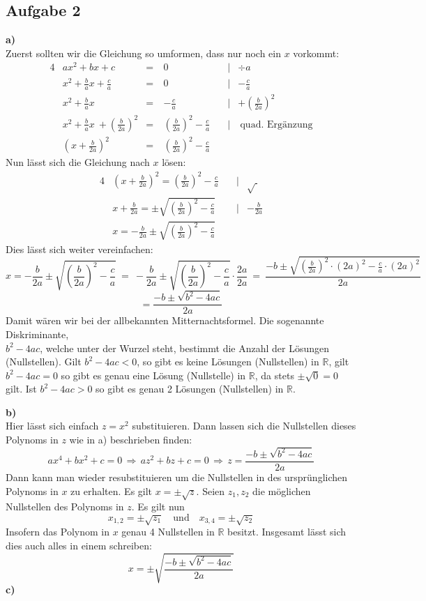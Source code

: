 \documentclass[a4paper,graphics,11pt]{article}
\newcommand{\aufgabe}[1]{\subsection*{Aufgabe #1}}
\begin{document}
\newpage
\aufgabe{2}
\textbf{a)}\\[5pt]
Zuerst sollten wir die Gleichung so umformen, dass nur noch ein $x$ vorkommt:
\begin{alignat*}{4}
    &ax^2+bx+c\ &=\ & 0 &|&\div a\\[2pt]
    &x^2+\frac{b}{a}x + \frac{c}{a}\ &=\ & 0 \quad &|& - \frac{c}{a}\\[2pt]
    &x^2+\frac{b}{a}x\ &=\ & -\frac{c}{a}&|& + \left(\frac{b}{2a}\right)^2\\[2pt]
    &x^2+\frac{b}{a}x\ + \left(\frac{b}{2a}\right)^2 &=\ & \left(\frac{b}{2a}\right)^2-\frac{c}{a}\quad&|&\ \text{quad. Ergänzung}\\[2pt]
    &\left(x+ \frac{b}{2a}\right)^2&=\ & \left(\frac{b}{2a}\right)^2-\frac{c}{a}\quad&&
\end{alignat*}
Nun lässt sich die Gleichung nach $x$ lösen:
\begin{alignat*}{4}
    &\left(x+\frac{b}{2a}\right)^2 = \left(\frac{b}{2a}\right)^2 - \frac{c}{a}\quad&|& \sqrt{\ }\\[2pt]
    &x+\frac{b}{2a} = \pm\sqrt{\left(\frac{b}{2a}\right)^2 - \frac{c}{a}}\quad&|& - \frac{b}{2a}\\[2pt]
    &x = -\frac{b}{2a}\pm\sqrt{\left(\frac{b}{2a}\right)^2 - \frac{c}{a}}
\end{alignat*}
Dies lässt sich weiter vereinfachen:
$$
    x = -\frac{b}{2a} \pm \sqrt{\left(\frac{b}{2a}\right)^2 -\frac{c}{a}}
    \ =\ -\frac{b}{2a} \pm \sqrt{\left(\frac{b}{2a}\right)^2-\frac{c}{a}} \cdot \frac{2a}{2a}
    \ =\ \frac{-b\pm \sqrt{\left(\frac{b}{2a}\right)^2\cdot (2a)^2-\frac{c}{a}\cdot (2a)^2}}{2a}
$$$$
    = \frac{-b\pm \sqrt{b^2-4ac}}{2a}
$$
Damit wären wir bei der allbekannten Mitternachtsformel. Die sogenannte Diskriminante,\\
$b^2-4ac$, welche unter der Wurzel steht, bestimmt die Anzahl der Lösungen (Nullstellen).
Gilt $b^2-4ac < 0$, so gibt es keine Lösungen (Nullstellen) in $\mathbb{R}$, gilt $b^2-4ac = 0$ so
gibt es genau eine Lösung (Nullstelle) in $\mathbb{R}$, da stets $\pm\sqrt{0}= 0$ gilt. Ist $b^2-4ac > 0$ so gibt
es genau 2 Lösungen (Nullstellen) in $\mathbb{R}$.

\textbf{b)}\\
Hier lässt sich einfach $z = x^2$ substituieren. Dann lassen sich die Nullstellen dieses
Polynoms in $z$ wie in a) beschrieben finden:
$$
    ax^4+bx^2+c = 0
    \,\Longrightarrow\, az^2+bz+c = 0
    \,\Longrightarrow\, z = \frac{-b \pm \sqrt{b^2-4ac}}{2a}
$$ 
Dann kann man wieder resubstituieren um die Nullstellen in des ursprünglichen Polynoms
in $x$ zu erhalten. Es gilt $x = \pm \sqrt{z}$. Seien $z_1, z_2$ die möglichen Nullstellen
des Polynoms in $z$. Es gilt nun
$$
    x_{1,2} = \pm\sqrt{z_1}\quad\text{und}\quad x_{3,4} = \pm \sqrt{z_2}
$$
Insofern das Polynom in $x$ genau 4 Nullstellen in $\mathbb{R}$ besitzt.
Insgesamt lässt sich dies auch alles in einem schreiben:
$$
    x = \pm\sqrt{\frac{-b\pm \sqrt{b^2-4ac}}{2a}}
$$
\newpage
\textbf{c)}
\end{document}
